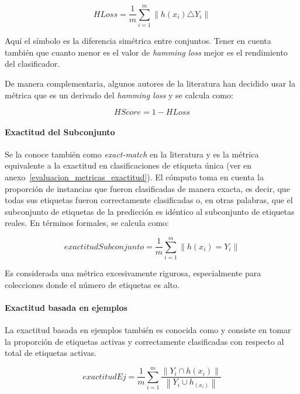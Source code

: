 \begin{equation}
	HLoss = \frac{1}{m} \sum_{i=1}^{m} \left\|h(x_{i}) \triangle Y_{i}\right\|
\end{equation}

Aquí el símbolo \comillas{$\triangle$} es la diferencia simétrica entre
conjuntos. Tener en cuenta también que cuanto menor es el valor de
\textit{hamming loss} mejor es el rendimiento del clasificador.

De manera complementaria, algunos autores de la literatura han decidido usar la
métrica  que es un derivado del \textit{hamming
	loss} y se calcula como:

\begin{equation}
	HScore = 1 - HLoss
\end{equation}

\paragraph{Exactitud del Subconjunto} Se la conoce también como
\textit{exact-match} en la literatura y es la métrica equivalente a la exactitud
en clasificaciones de etiqueta única (ver  en
anexo~\ref{evaluacion_metricas_exactitud}). El cómputo toma en cuenta la
proporción de instancias que fueron clasificadas de manera exacta, es decir, que
todas sus etiquetas fueron correctamente clasificadas o, en otras palabras, que
el subconjunto de etiquetas de la predicción es idéntico al subconjunto de
etiquetas reales. En términos formales, se calcula como:

\begin{equation}
	exactitudSubconjunto = \frac{1}{m} \sum_{i=1}^{m} \left\|h(x_{i}) =
	Y_{i}\right\|
\end{equation}

Es considerada una métrica excesivamente rigurosa, especialmente para
colecciones donde el número de etiquetas es alto.

\paragraph{Exactitud basada en ejemplos}

La exactitud basada en ejemplos también es conocida como  y consiste en tomar la proporción de etiquetas activas y correctamente
clasificadas con respecto al total de etiquetas activas.

\begin{equation}
	exactitudEj = \frac{1}{m} \sum_{i=1}^{m}
	\frac{\left\|Y_{i} \cap h(x_{i})\right\|}
	{\left\|Y_{i} \cup h_(x_{i})\right\|}
\end{equation}


